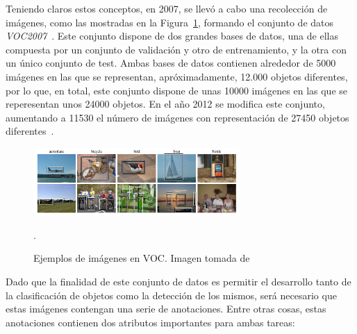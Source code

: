 Teniendo claros estos conceptos, en 2007, se llevó a cabo una recolección de imágenes, como las mostradas en la Figura~\ref{fig.voc_example}, formando el conjunto de datos \textit{\ac{VOC}}\textit{2007}~\cite{pascal-voc-2007}. Este conjunto dispone de dos grandes bases de datos, una de ellas compuesta por un conjunto de validación y otro de entrenamiento, y la otra con un único conjunto de test. Ambas bases de datos contienen alrededor de 5000 imágenes en las que se representan, apróximadamente, 12.000 objetos diferentes, por lo que, en total, este conjunto dispone de unas 10000 imágenes en las que se reperesentan unos 24000 objetos. En el año 2012 se modifica este conjunto, aumentando a 11530 el número de imágenes con representación de 27450 objetos diferentes~\cite{pascal-voc-2012}.

\begin{figure}[H]
	\begin{center}
		\includegraphics[width=0.7\textwidth]{figures/vocexample}
		\caption{Ejemplos de imágenes en \ac{VOC}. Imagen tomada de~\cite{Everingham10}}.
		\label{fig.voc_example}
	\end{center}
\end{figure}

Dado que la finalidad de este conjunto de datos es permitir el desarrollo tanto de la clasificación de objetos como la detección de los mismos, será necesario que estas imágenes contengan una serie de anotaciones. Entre otras cosas, estas anotaciones contienen dos atributos importantes para ambas tareas:

